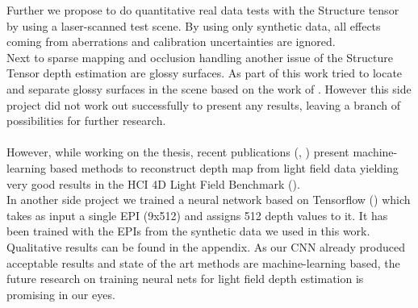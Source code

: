 \documentclass  [
  paper    = a4,
  BCOR     = 10mm,
  twoside,
  fontsize = 12pt,
  fleqn,
  toc      = bibnumbered,
  toc      = listofnumbered,
  numbers  = noendperiod,
  headings = normal,
  listof   = leveldown,
  version  = 3.03
]                                       {scrreprt}
\begin{document}
Further we propose to do quantitative real data tests with the Structure tensor by using a laser-scanned test scene. By using only synthetic data, all effects coming from aberrations and calibration uncertainties are ignored.\\
Next to sparse mapping and occlusion handling another issue of the Structure Tensor depth estimation are glossy surfaces. As part of this work tried to locate and separate glossy surfaces in the scene based on the work of \cite{tao2017shape}. However this side project did not work out successfully to present any results, leaving a branch of possibilities for further research.\\
\\ 
However, while working on the thesis, recent publications (\cite{luo2017epi}, \cite{shin18epinet}) present machine-learning based methods to reconstruct depth map from light field data yielding very good results in the HCI 4D Light Field Benchmark (\cite{hci_benchmark}).\\
In another side project we trained a neural network based on Tensorflow (\cite{tensorflow2015-whitepaper}) which takes as input a single EPI (9x512) and assigns 512 depth values to it. It has been trained with the EPIs from the synthetic data we used in this work. Qualitative results can be found in the appendix. As our CNN already produced acceptable results and state of the art methods are machine-learning based, the future research on training neural nets for light field depth estimation is promising in our eyes.
\end{document}
